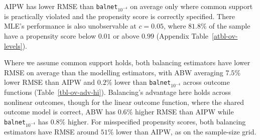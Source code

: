 \documentclass[
  12pt,
  a4paper,
]{article}
\begin{document}
AIPW has lower RMSE than \texttt{balnet}\(_{10^{-4}}\) on average only
where common support is practically violated and the propensity score is
correctly specified. There MLE's performance is also unobservable at
\(c = 0.05\), where \(81.8\%\) of the sample have a propensity score
below \(0.01\) or above \(0.99\) (Appendix Table~\ref{atbl-ov-levels}).

Where we assume common support holds, both balancing estimators have
lower RMSE on average than the modelling estimators, with ABW averaging
\(7.5\%\) lower RMSE than AIPW and \(0.2\%\) lower than
\texttt{balnet}\(_{10^{-4}}\) across outcome functions
(Table~\ref{tbl-ov-adv-hi}). Balancing's advantage here holds across
nonlinear outcomes, though for the linear outcome function, where the
shared outcome model is correct, ABW has \(0.6\%\) higher RMSE than AIPW
while \texttt{balnet}\(_{10^{-4}}\) has \(0.8\%\) higher. For
misspecified propensity scores, both balancing estimators have RMSE
around \(51\%\) lower than AIPW, as on the sample-size grid.
\end{document}
